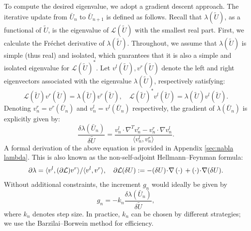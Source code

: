 \documentclass[11pt,a4paper]{article}
\numberwithin{equation}{section}
\newcommand{\assign}{:=}
\newcommand{\cdummy}{\cdot}
\begin{document}
To compute the desired eigenvalue, we adopt a gradient descent approach. The
iterative update from $\bar{U}_n$ to $\bar{U}_{n + 1}$ is defined as follows.
Recall that $\lambda (\tilde{U})$, as a functional of $\tilde{U}$, is the
eigenvalue of $\mathcal{L} (\tilde{U})$ with the smallest real part. First, we
calculate the Fr{\'e}chet derivative of $\lambda (\tilde{U})$. Throughout, we
assume that $\lambda (\tilde{U})$ is simple (thus real) and isolated, which
guarantees that it is also a simple and isolated eigenvalue for $\mathcal{L}
(\tilde{U})^{\ast}$. Let $v^l (\tilde{U}), v^r (\tilde{U})$ denote the left
and right eigenvectors associated with the eigenvalue $\lambda (\tilde{U})$,
respectively satisfying:
\[ \mathcal{L} (\tilde{U}) v^r (\tilde{U}) = \lambda (\tilde{U}) v^r
   (\tilde{U}), \quad \mathcal{L} (\tilde{U})^{\ast} v^l (\tilde{U}) = \lambda
   (\tilde{U}) v^l (\tilde{U}) . \]
Denoting $v^r_n = v^r (\bar{U}_n)$ and $v^l_n = v^l (\bar{U}_n)$ respectively,
the gradient of $\lambda (\bar{U}_n)$ is explicitly given by:
\begin{equation}
  \frac{\delta \lambda (\bar{U}_n)}{\delta \tilde{U}} = \frac{v^l_n \cdot
  \nabla^T v^r_n - v^r_n \cdot \nabla v^l_n}{\langle v^l_n, v^r_n \rangle} .
  \label{eq:gradient lambda}
\end{equation}
A formal derivation of the above equation is provided in Appendix
\ref{sec:nabla lambda}. This is also known as the non-self-adjoint
Hellmann--Feynman formula:
\[ \partial \lambda = \langle v^l, (\partial \mathcal{L}) v^r \rangle /
   \langle v^l, v^r \rangle, \quad \partial \mathcal{L} (\delta U) \assign -
   (\delta U)  \hspace{-0.17em} \cdummy \hspace{-0.17em} \nabla
   \hspace{0.17em} (\cdummy) \hspace{0.17em} + (\cdummy)  \hspace{-0.17em}
   \cdummy \hspace{-0.17em} \nabla (\delta U) . \]
Without additional constraints, the increment $g_n$ would ideally be given by
\[ g_n = - k_n \frac{\delta \lambda (\bar{U}_n)}{\delta \tilde{U}}, \]
where $k_n$ denotes step size. In practice, $k_n$ can be chosen by different
strategies; we use the Barzilai--Borwein method {\cite{barzilai1988two}} for
efficiency.
\end{document}
